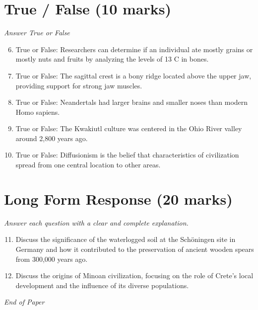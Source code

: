 \documentclass[12pt]{article}
\begin{document}
\section*{True / False (10 marks)}
\textit{Answer True or False}
\begin{enumerate}[label=\arabic*.]
\setcounter{enumi}{5}
\item True or False: Researchers can determine if an individual ate mostly grains or mostly nuts and fruits by analyzing the levels of 13 C in bones.
\item True or False: The sagittal crest is a bony ridge located above the upper jaw, providing support for strong jaw muscles.
\item True or False: Neandertals had larger brains and smaller noses than modern Homo sapiens.
\item True or False: The Kwakiutl culture was centered in the Ohio River valley around 2,800 years ago.
\item True or False: Diffusionism is the belief that characteristics of civilization spread from one central location to other areas.
\end{enumerate}

\section*{Long Form Response (20 marks)}
\textit{Answer each question with a clear and complete explanation.}
\begin{enumerate}[label=\arabic*.]
\setcounter{enumi}{10}
\item Discuss the significance of the waterlogged soil at the Schöningen site in Germany and how it contributed to the preservation of ancient wooden spears from 300,000 years ago.
\item Discuss the origins of Minoan civilization, focusing on the role of Crete's local development and the influence of its diverse populations.
\end{enumerate}

\vfill
\noindent\textit{End of Paper}
\end{document}
